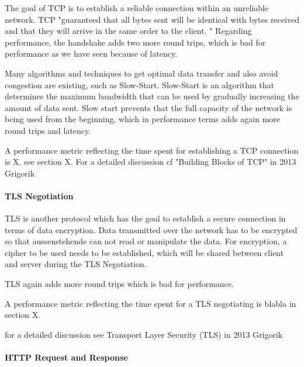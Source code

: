 The goal of TCP is to establish a reliable connection within an unreliable network.
TCP  "guaranteed that all bytes sent will be identical with bytes received and that they will arrive in the same order to the client. " %
Regarding performance, the handshake adds two more round trips, which is bad for performance as we have seen because of latency.

Many algorithms and techniques to get optimal data transfer and also avoid congestion are existing, such as Slow-Start.
Slow-Start is an algorithm that determines the maximum bandwidth that can be used by gradually increasing the amount of data sent.
Slow start prevents that the full capacity of the network is being used from the beginning, which in performance terms adds again more round trips and latency. %


A performance metric reflecting the time spent for establishing a TCP connection is X, see section X.
For a detailed discussion cf "Building Blocks of TCP" in 2013 Grigorik %




\paragraph{TLS Negotiation}

TLS is another protocol which has the goal to establish a secure connection in terms of data encryption.
Data transmitted over the network has to be encrypted so that aussenstehende can not read or manipulate the data.
For encryption,  a cipher to be used needs to be established, which will be shared between client and server during the TLS Negotiation. %

TLS again adds more round trips which is bad for performance.

A performance metric reflecting the time spent for a TLS negotiating is blabla in section X.

for a detailed discussion see Transport Layer Security (TLS) in 2013 Grigorik %




\paragraph{HTTP Request and Response}

